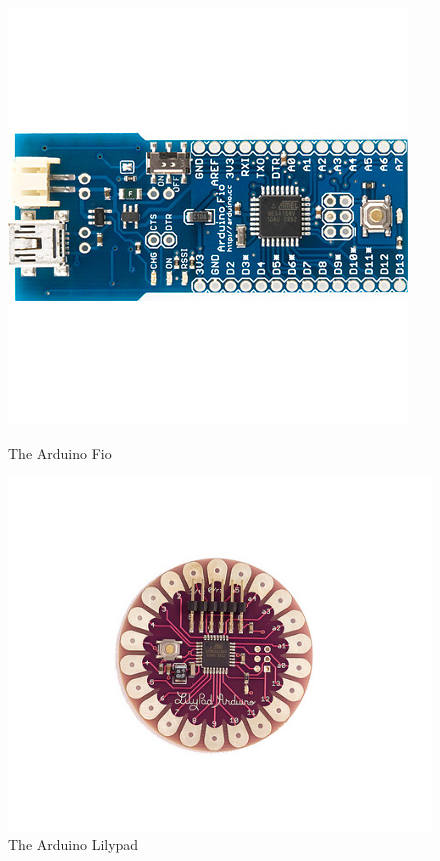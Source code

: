 \begin{figure}[H]
	\begin{minipage}[b]{0.5\linewidth}
		\centering
		\includegraphics[scale=0.35]{img/design-arduinofio.png}
		\caption{The Arduino Fio \cite{link:arduino-fio}}
		\label{fig:design-arduinofio}
	\end{minipage}
		\hspace{0.5cm}
	\begin{minipage}[b]{0.5\linewidth}
		\centering
		\includegraphics[scale=1.50]{img/design-arduinolilypad}
		\caption{The Arduino Lilypad \cite{link:arduino-lilypad}}
		\label{fig:design-arduinolilypad}
	\end{minipage}
\end{figure}

